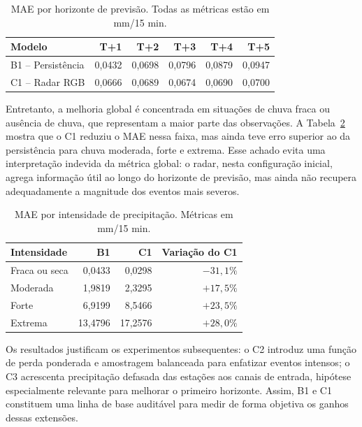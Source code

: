 \begin{table}[htbp]
\centering
\caption{MAE por horizonte de previsão. Todas as métricas estão em mm/15 min.}
\label{tab:b1-c1-horizontes}
\begin{tabular}{lrrrrr}
\toprule
\textbf{Modelo} & \textbf{T+1} & \textbf{T+2} & \textbf{T+3} & \textbf{T+4} & \textbf{T+5} \\
\midrule
B1 -- Persistência & 0,0432 & 0,0698 & 0,0796 & 0,0879 & 0,0947 \\
C1 -- Radar RGB & 0,0666 & 0,0689 & 0,0674 & 0,0690 & 0,0700 \\
\bottomrule
\end{tabular}
\end{table}

Entretanto, a melhoria global é concentrada em situações de chuva fraca ou ausência de chuva, que representam a maior parte das observações. A Tabela~\ref{tab:b1-c1-intensidade} mostra que o C1 reduziu o MAE nessa faixa, mas ainda teve erro superior ao da persistência para chuva moderada, forte e extrema. Esse achado evita uma interpretação indevida da métrica global: o radar, nesta configuração inicial, agrega informação útil ao longo do horizonte de previsão, mas ainda não recupera adequadamente a magnitude dos eventos mais severos.

\begin{table}[htbp]
\centering
\caption{MAE por intensidade de precipitação. Métricas em mm/15 min.}
\label{tab:b1-c1-intensidade}
\begin{tabular}{lrrr}
\toprule
\textbf{Intensidade} & \textbf{B1} & \textbf{C1} & \textbf{Variação do C1} \\
\midrule
Fraca ou seca & 0,0433 & 0,0298 & $-31,1\%$ \\
Moderada & 1,9819 & 2,3295 & $+17,5\%$ \\
Forte & 6,9199 & 8,5466 & $+23,5\%$ \\
Extrema & 13,4796 & 17,2576 & $+28,0\%$ \\
\bottomrule
\end{tabular}
\end{table}

Os resultados justificam os experimentos subsequentes: o C2 introduz uma função de perda ponderada e amostragem balanceada para enfatizar eventos intensos; o C3 acrescenta precipitação defasada das estações aos canais de entrada, hipótese especialmente relevante para melhorar o primeiro horizonte. Assim, B1 e C1 constituem uma linha de base auditável para medir de forma objetiva os ganhos dessas extensões.

